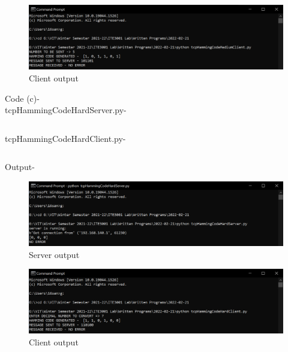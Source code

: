 \documentclass[12pt]{article}
\begin{document}
\begin{figure}[h] %
\centering
\includegraphics[width=\textwidth]{tcpHammingCodeMediumClient.png}
\caption{Client output}
\end{figure}
\newline
Code (c)- \\ tcpHammingCodeHardServer.py-\inputminted{python}{tcpHammingCodeHardServer.py}
tcpHammingCodeHardClient.py- \inputminted{python}{tcpHammingCodeHardClient.py}
\newpage
Output-
\begin{figure}[h] %
\centering
\includegraphics[width=\textwidth]{tcpHammingCodeHardServer.png}
\caption{Server output}
\end{figure}
\begin{figure}[h] %
\centering
\includegraphics[width=\textwidth]{tcpHammingCodeHardClient.png}
\caption{Client output}
\end{figure}
\end{document}
